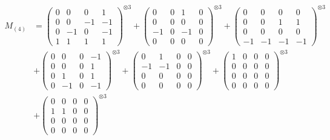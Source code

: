 \documentclass{article}
\newcommand{\Mthree}{%
    M_{(4)}
}
\begin{document}
        \newpage
        
        \footnotesize{
        \begin{align}
        \Mthree
        &= \label{Rs16-Rc11-Strassen-1-c1} \begin{pmatrix} 0 & 0 & 0 & 1 \\ 0 & 0 & -1 & -1 \\ 0 & -1 & 0 & -1 \\ 1 & 1 & 1 & 1 \end{pmatrix}^{\otimes 3} 
            + \begin{pmatrix} 0 & 0 & 1 & 0 \\ 0 & 0 & 0 & 0 \\ -1 & 0 & -1 & 0 \\ 0 & 0 & 0 & 0 \end{pmatrix}^{\otimes 3} 
            + \begin{pmatrix} 0 & 0 & 0 & 0 \\ 0 & 0 & 1 & 1 \\ 0 & 0 & 0 & 0 \\ -1 & -1 & -1 & -1 \end{pmatrix}^{\otimes 3} \\
        &+ \label{Rs16-Rc11-Strassen-1-c4} \begin{pmatrix} 0 & 0 & 0 & -1 \\ 0 & 0 & 0 & 1 \\ 0 & 1 & 0 & 1 \\ 0 & -1 & 0 & -1 \end{pmatrix}^{\otimes 3} 
            + \begin{pmatrix} 0 & 1 & 0 & 0 \\ -1 & -1 & 0 & 0 \\ 0 & 0 & 0 & 0 \\ 0 & 0 & 0 & 0 \end{pmatrix}^{\otimes 3} 
            + \begin{pmatrix} 1 & 0 & 0 & 0 \\ 0 & 0 & 0 & 0 \\ 0 & 0 & 0 & 0 \\ 0 & 0 & 0 & 0 \end{pmatrix}^{\otimes 3} \\
        &+ \label{Rs16-Rc11-Strassen-1-c7} \begin{pmatrix} 0 & 0 & 0 & 0 \\ 1 & 1 & 0 & 0 \\ 0 & 0 & 0 & 0 \\ 0 & 0 & 0 & 0 \end{pmatrix}^{\otimes 3} 

\end{align}}
\end{document}
